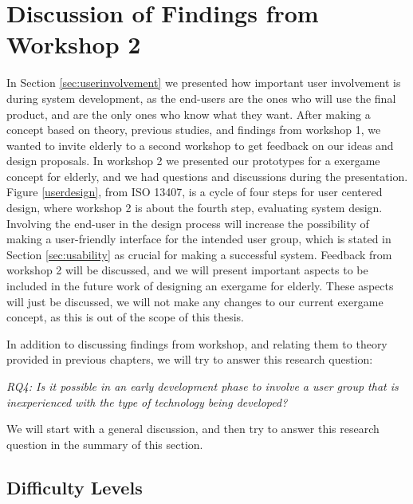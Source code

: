 \section{Discussion of Findings from Workshop 2}
In Section \ref{sec:userinvolvement} we presented how important user involvement is during system development, as the end-users are the ones who will use the final product, and are the only ones who know what they want. After making a concept based on theory, previous studies, and findings from workshop 1, we wanted to invite elderly to a second workshop to get feedback on our ideas and design proposals. In workshop 2 we presented our prototypes for a exergame concept for elderly, and we had questions and discussions during the presentation. Figure \ref{userdesign}, from ISO 13407, is a cycle of four steps for user centered design, where workshop 2 is about the fourth step, evaluating system design. Involving the end-user in the design process will increase the possibility of making a user-friendly interface for the intended user group, which is stated in Section \ref{sec:usability} as crucial for making a successful system. Feedback from workshop 2 will be discussed, and we will present important aspects to be included in the future work of designing an exergame for elderly. These aspects will just be discussed, we will not make any changes to our current exergame concept, as this is out of the scope of this thesis.

In addition to discussing findings from workshop, and relating them to theory provided in previous chapters, we will try to answer this research question:
 
\emph{RQ4: Is it possible in an early development phase to involve a user group that is inexperienced with the type of technology being developed?}

We will start with a general discussion, and then try to answer this research question in the summary of this section. 

\subsection{Difficulty Levels}

